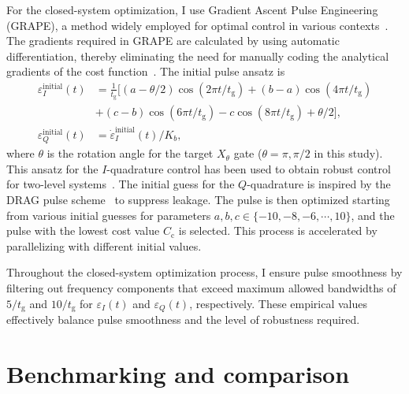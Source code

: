 For the closed-system optimization, I use Gradient Ascent Pulse Engineering (GRAPE), a method widely employed for optimal control in various contexts~\cite{nmrkhaneja2005optimal,lu2023optimalgrape,koch2022quantumqocreview}. The gradients required in GRAPE are calculated by using automatic differentiation, thereby eliminating the need for manually coding the analytical gradients of the cost function~\cite{adscalingbaydin2014automatic,pacleung2017speedup,abdelhafez2019gradient}. The initial pulse ansatz is
\begin{align}
\label{eq:initial_pulse}
    \varepsilon^\text{initial}_I(t) &=\frac{1}{t_\text{g}}\big[ (a-\theta/2)\cos(2\pi t /t_\text{g}) + (b-a)\cos(4\pi t /t_\text{g})\\ 
\nonumber     &+(c-b)\cos(6\pi t / t_\text{g}) - c\cos(8\pi t / t_\text{g}) + \theta/2\big],\\
\nonumber    \varepsilon_Q^\text{initial}(t) & = \dot{\varepsilon}_I^\text{initial}(t) / K_b,
\end{align}
where $\theta$ is the rotation angle for the target $X_\theta$ gate ($\theta=\pi,\pi/2$ in this study). This ansatz for the $I$-quadrature control has been used to obtain robust control for two-level systems~\cite{pasini2009optimizedinitialpulse}. The initial guess for the $Q$-quadrature is inspired by the DRAG pulse scheme~\cite{Motzoi2009} to suppress leakage. 
The pulse is then optimized starting from various initial guesses for parameters $a,b,c\in\{-10,-8,-6,\cdots,10\}$, and the pulse with the lowest cost value $C_\text{c}$ is selected. This process is accelerated by parallelizing with different initial values.

Throughout the closed-system optimization process, I ensure pulse smoothness by filtering out frequency components that exceed maximum allowed bandwidths of $5/t_\text{g}$ and $10/t_\text{g}$ for $\varepsilon_I(t)$ and $\varepsilon_Q(t)$, respectively. These empirical values effectively balance pulse smoothness and the level of robustness required.

\section{Benchmarking and comparison}
\label{sec:benchmarking}

